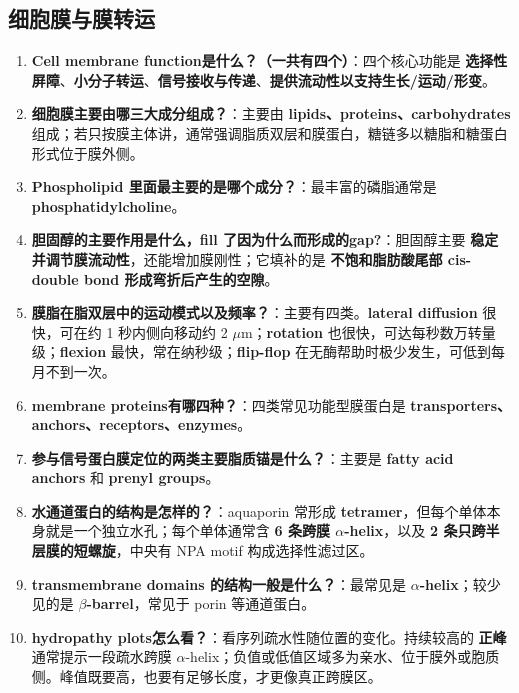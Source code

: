 \documentclass[12pt,fontset=none]{ctexart}
\begin{document}
\subsection*{细胞膜与膜转运}
\begin{enumerate}
\item \textbf{Cell membrane function是什么？（一共有四个）}：四个核心功能是 \textbf{选择性屏障}、\textbf{小分子转运}、\textbf{信号接收与传递}、\textbf{提供流动性以支持生长/运动/形变}。

\item \textbf{细胞膜主要由哪三大成分组成？}：主要由 \textbf{lipids、proteins、carbohydrates} 组成；若只按膜主体讲，通常强调脂质双层和膜蛋白，糖链多以糖脂和糖蛋白形式位于膜外侧。

\item \textbf{Phospholipid 里面最主要的是哪个成分？}：最丰富的磷脂通常是 \textbf{phosphatidylcholine}。

\item \textbf{胆固醇的主要作用是什么，fill 了因为什么而形成的gap?}：胆固醇主要 \textbf{稳定并调节膜流动性}，还能增加膜刚性；它填补的是 \textbf{不饱和脂肪酸尾部 cis-double bond 形成弯折后产生的空隙}。

\item \textbf{膜脂在脂双层中的运动模式以及频率？}：主要有四类。\textbf{lateral diffusion} 很快，可在约 1 秒内侧向移动约 2 $\mu$m；\textbf{rotation} 也很快，可达每秒数万转量级；\textbf{flexion} 最快，常在纳秒级；\textbf{flip-flop} 在无酶帮助时极少发生，可低到每月不到一次。

\item \textbf{membrane proteins有哪四种？}：四类常见功能型膜蛋白是 \textbf{transporters、anchors、receptors、enzymes}。

\item \textbf{参与信号蛋白膜定位的两类主要脂质锚是什么？}：主要是 \textbf{fatty acid anchors} 和 \textbf{prenyl groups}。

\item \textbf{水通道蛋白的结构是怎样的？}：aquaporin 常形成 \textbf{tetramer}，但每个单体本身就是一个独立水孔；每个单体通常含 \textbf{6 条跨膜 $\alpha$-helix}，以及 \textbf{2 条只跨半层膜的短螺旋}，中央有 NPA motif 构成选择性滤过区。

\item \textbf{transmembrane domains 的结构一般是什么？}：最常见是 \textbf{$\alpha$-helix}；较少见的是 \textbf{$\beta$-barrel}，常见于 porin 等通道蛋白。

\item \textbf{hydropathy plots怎么看？}：看序列疏水性随位置的变化。持续较高的 \textbf{正峰} 通常提示一段疏水跨膜 $\alpha$-helix；负值或低值区域多为亲水、位于膜外或胞质侧。峰值既要高，也要有足够长度，才更像真正跨膜区。


\end{enumerate}
\end{document}
